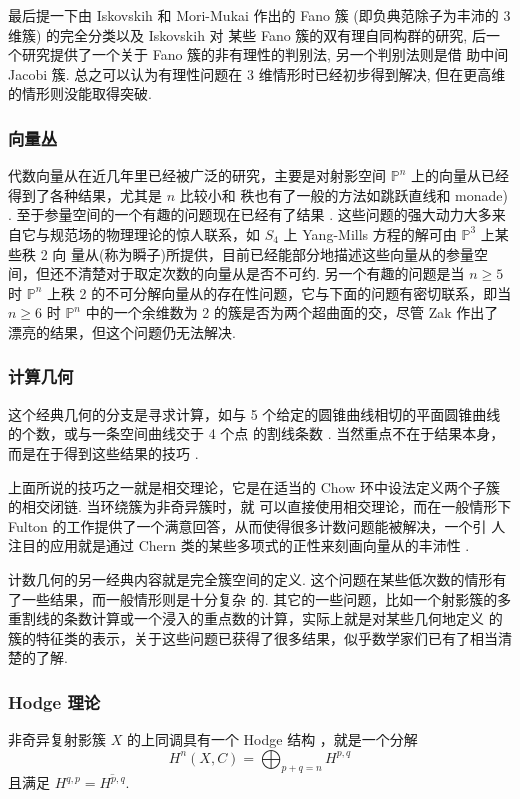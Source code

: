 \documentclass[UTF8,AutoFakeBold,scheme=chinese,eversion]{GXMU-Thesis}
\begin{document}
最后提一下由 Iskovskih 和 Mori-Mukai 作出的 Fano 簇 (即负典范除子为丰沛的 3 维簇) 的完全分类以及 Iskovskih 对 某些 Fano 簇的双有理自同构群的研究, 后一个研究提供了一个关于 Fano 簇的非有理性的判别法, 另一个判别法则是借 助中间 Jacobi 簇. 总之可以认为有理性问题在 3 维情形时已经初步得到解决, 但在更高维的情形则没能取得突破.

\subsubsection{向量丛}

代数向量从在近几年里已经被广泛的研究，主要是对射影空间 $\mathbb{P}^n$ 上的向量从已经得到了各种结果，尤其是 $n$ 比较小和 秩也有了一般的方法如跳跃直线和 monade) . 至于参量空间的一个有趣的问题现在已经有了结果 .
这些问题的强大动力大多来自它与规范场的物理理论的惊人联系，如 $S_4$ 上 Yang-Mills 方程的解可由 $\mathbb{P}^3$ 上某些秩 2 向 量从(称为瞬子)所提供，目前已经能部分地描述这些向量从的参量空间，但还不清楚对于取定次数的向量从是否不可约.
另一个有趣的问题是当 $n \geq 5$ 时 $\mathbb{P}^n$ 上秩 2 的不可分解向量从的存在性问题，它与下面的问题有密切联系，即当 $n \geq 6$ 时 $\mathbb{P}^n$ 中的一个余维数为 2 的簇是否为两个超曲面的交，尽管 Zak 作出了漂亮的结果，但这个问题仍无法解决.
\subsubsection{计算几何}

这个经典几何的分支是寻求计算，如与 5 个给定的圆锥曲线相切的平面圆锥曲线的个数，或与一条空间曲线交于 4 个点 的割线条数 . 当然重点不在于结果本身，而是在于得到这些结果的技巧 .

上面所说的技巧之一就是相交理论，它是在适当的 Chow 环中设法定义两个子簇的相交闭链. 当环绕簇为非奇异簇时，就 可以直接使用相交理论，而在一般情形下 Fulton 的工作提供了一个满意回答，从而使得很多计数问题能被解决，一个引 人注目的应用就是通过 Chern 类的某些多项式的正性来刻画向量从的丰沛性 .

计数几何的另一经典内容就是完全簇空间的定义. 这个问题在某些低次数的情形有了一些结果，而一般情形则是十分复杂 的. 其它的一些问题，比如一个射影簇的多重割线的条数计算或一个浸入的重点数的计算，实际上就是对某些几何地定义 的簇的特征类的表示，关于这些问题已获得了很多结果，似乎数学家们已有了相当清楚的了解.
\subsubsection{Hodge 理论}

非奇异复射影簇 $X$ 的上同调具有一个 Hodge 结构 ，就是一个分解 $$H^n(X, C)=\bigoplus_{p+q=n} H^{p, q}$$ 且满足 $H^{q, p}=\overline{H^{p, q}}$.
\end{document}
